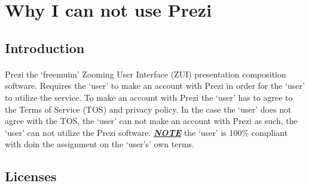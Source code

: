 \section*{Why I can not use Prezi\texttrademark{}}
\subsection*{Introduction}
\paragraph{}
Prezi\texttrademark{} the `freemuim' Zooming User Interface (ZUI) presentation
composition software. Requires the `user' to make an account with
Prezi\texttrademark{} in order for the `user' to utilize the service. To make an
account with Prezi\texttrademark{} the `user' has to agree to the Terms of
Service (TOS) and privacy policy. In the case the `user' does not agree with the
TOS, the `user' can not make an account with Prezi\texttrademark{} as such, the
`user' can not utilize the Prezi\texttrademark{} software.
\textit{\textbf{\underline{NOTE}}} the `user' is 100\% compliant with doin the
assignment on the `user's' own terms.
\par

\subsection{Licenses}

